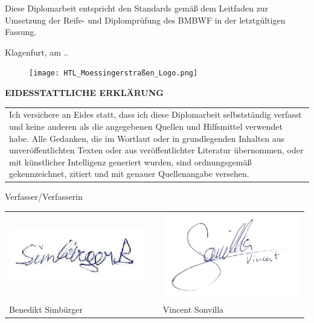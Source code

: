 \documentclass[12pt, twoside]{article}
\newcommand{\todayD}{\the\day.\the\month.\the\year}
\begin{document}
\vspace{7mm}
\large
Diese Diplomarbeit entspricht den Standards gemäß dem Leitfaden zur Umsetzung der Reife- und Diplomprüfung des BMBWF in der letztgültigen Fassung.\par
\begin{flushright}
    Klagenfurt, am \todayD
\end{flushright}

\newpage\null\thispagestyle{empty}\newpage

\begin{figure}[h]
    \texttt{[image: HTL\_Moessingerstraßen\_Logo.png]}
    \centering
\end{figure}

\begin{center}
    \huge \textbf{EIDESSTATTLICHE ERKLÄRUNG}\\
    \vspace{7mm}
    \large
    \begin{tabular}{p{14cm}}
        Ich versichere an Eides statt, dass ich diese Diplomarbeit
        selbstständig verfasst und keine anderen als die angegebenen
        Quellen und Hilfsmittel verwendet habe. Alle Gedanken, die im
        Wortlaut oder in grundlegenden Inhalten aus unveröffentlichten
        Texten oder aus veröffentlichter Literatur übernommen, oder mit
        künstlicher Intelligenz generiert wurden, sind ordnungsgemäß
        gekennzeichnet, zitiert und mit genauer Quellenangabe
        versehen.
    \end{tabular}

    \vspace{10mm}
    Verfasser/Verfasserin\\
    \vspace{10mm}
    \begin{tabular}{P{67mm}cP{67mm}}
        \includegraphics[width=60mm]{sign_simbuerger.jpg} & & \includegraphics[width=60mm]{sign_sonvilla.jpg} \\
        Benedikt Simbürger & & Vincent Sonvilla\\
    \end{tabular}
    


\end{center}
\end{document}
